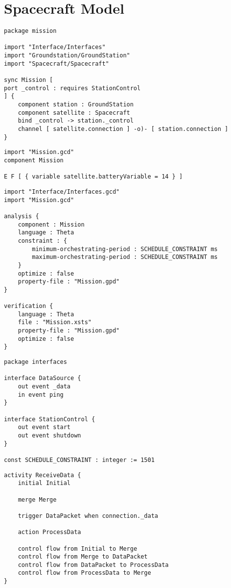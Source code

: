 \clearpage\section{Spacecraft Model}\label{sec:spacecraft-model}

\begin{lstlisting}[float,language=statechart, caption={}, label={}]
package mission

import "Interface/Interfaces"
import "Groundstation/GroundStation"
import "Spacecraft/Spacecraft"

sync Mission [
port _control : requires StationControl
] {
	component station : GroundStation
	component satellite : Spacecraft
	bind _control -> station._control
	channel [ satellite.connection ] -o)- [ station.connection ]
}
\end{lstlisting}

\begin{lstlisting}[float,language=statechart, caption={}, label={}]
import "Mission.gcd"
component Mission

E F [ { variable satellite.batteryVariable = 14 } ]
\end{lstlisting}

\begin{lstlisting}[float,language=statechart, caption={}, label={}]
import "Interface/Interfaces.gcd"
import "Mission.gcd"

analysis {
	component : Mission
	language : Theta
	constraint : {
		minimum-orchestrating-period : SCHEDULE_CONSTRAINT ms
		maximum-orchestrating-period : SCHEDULE_CONSTRAINT ms
	}
	optimize : false
	property-file : "Mission.gpd"
}

verification {
	language : Theta
	file : "Mission.xsts"
	property-file : "Mission.gpd"
	optimize : false
}
\end{lstlisting}

\begin{lstlisting}[float,language=statechart, caption={}, label={}]
package interfaces

interface DataSource {
	out event _data
	in event ping
}

interface StationControl {
	out event start
	out event shutdown
}

const SCHEDULE_CONSTRAINT : integer := 1501
\end{lstlisting}

\begin{lstlisting}[float,language=statechart, caption={}, label={}]
activity ReceiveData {
	initial Initial
	
	merge Merge
	
	trigger DataPacket when connection._data
	
	action ProcessData
	
	control flow from Initial to Merge
	control flow from Merge to DataPacket
	control flow from DataPacket to ProcessData
	control flow from ProcessData to Merge
}
\end{lstlisting}

